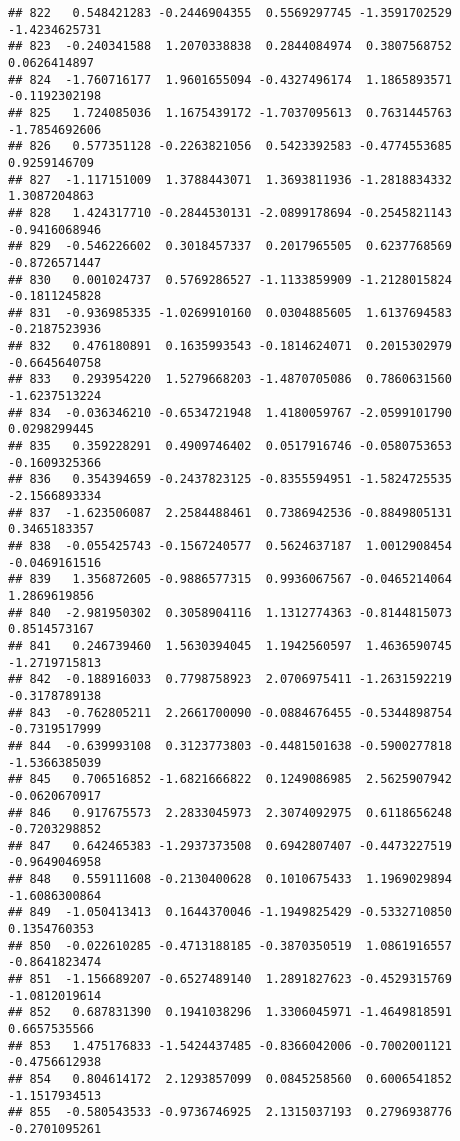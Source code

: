 \documentclass[
]{article}
\begin{document}
\begin{verbatim}
## 822   0.548421283 -0.2446904355  0.5569297745 -1.3591702529 -1.4234625731
## 823  -0.240341588  1.2070338838  0.2844084974  0.3807568752  0.0626414897
## 824  -1.760716177  1.9601655094 -0.4327496174  1.1865893571 -0.1192302198
## 825   1.724085036  1.1675439172 -1.7037095613  0.7631445763 -1.7854692606
## 826   0.577351128 -0.2263821056  0.5423392583 -0.4774553685  0.9259146709
## 827  -1.117151009  1.3788443071  1.3693811936 -1.2818834332  1.3087204863
## 828   1.424317710 -0.2844530131 -2.0899178694 -0.2545821143 -0.9416068946
## 829  -0.546226602  0.3018457337  0.2017965505  0.6237768569 -0.8726571447
## 830   0.001024737  0.5769286527 -1.1133859909 -1.2128015824 -0.1811245828
## 831  -0.936985335 -1.0269910160  0.0304885605  1.6137694583 -0.2187523936
## 832   0.476180891  0.1635993543 -0.1814624071  0.2015302979 -0.6645640758
## 833   0.293954220  1.5279668203 -1.4870705086  0.7860631560 -1.6237513224
## 834  -0.036346210 -0.6534721948  1.4180059767 -2.0599101790  0.0298299445
## 835   0.359228291  0.4909746402  0.0517916746 -0.0580753653 -0.1609325366
## 836   0.354394659 -0.2437823125 -0.8355594951 -1.5824725535 -2.1566893334
## 837  -1.623506087  2.2584488461  0.7386942536 -0.8849805131  0.3465183357
## 838  -0.055425743 -0.1567240577  0.5624637187  1.0012908454 -0.0469161516
## 839   1.356872605 -0.9886577315  0.9936067567 -0.0465214064  1.2869619856
## 840  -2.981950302  0.3058904116  1.1312774363 -0.8144815073  0.8514573167
## 841   0.246739460  1.5630394045  1.1942560597  1.4636590745 -1.2719715813
## 842  -0.188916033  0.7798758923  2.0706975411 -1.2631592219 -0.3178789138
## 843  -0.762805211  2.2661700090 -0.0884676455 -0.5344898754 -0.7319517999
## 844  -0.639993108  0.3123773803 -0.4481501638 -0.5900277818 -1.5366385039
## 845   0.706516852 -1.6821666822  0.1249086985  2.5625907942 -0.0620670917
## 846   0.917675573  2.2833045973  2.3074092975  0.6118656248 -0.7203298852
## 847   0.642465383 -1.2937373508  0.6942807407 -0.4473227519 -0.9649046958
## 848   0.559111608 -0.2130400628  0.1010675433  1.1969029894 -1.6086300864
## 849  -1.050413413  0.1644370046 -1.1949825429 -0.5332710850  0.1354760353
## 850  -0.022610285 -0.4713188185 -0.3870350519  1.0861916557 -0.8641823474
## 851  -1.156689207 -0.6527489140  1.2891827623 -0.4529315769 -1.0812019614
## 852   0.687831390  0.1941038296  1.3306045971 -1.4649818591  0.6657535566
## 853   1.475176833 -1.5424437485 -0.8366042006 -0.7002001121 -0.4756612938
## 854   0.804614172  2.1293857099  0.0845258560  0.6006541852 -1.1517934513
## 855  -0.580543533 -0.9736746925  2.1315037193  0.2796938776 -0.2701095261

\end{verbatim}
\end{document}
